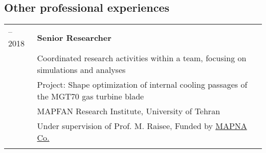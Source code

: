 
\subsection{Other professional experiences}{}
\begin{longtable}[l]{>{\raggedleft\arraybackslash}p{}|p{}}

   

    2015 -- 2018 & \textbf{Senior Researcher}\\
    & Coordinated research activities within a team, focusing on simulations and analyses \\
    & Project: Shape optimization of internal cooling passages of the MGT70 gas turbine blade\\
    & MAPFAN Research Institute, University of Tehran \\
    & Under supervision of Prof. M. Raisee, Funded by \href{http://www.mapnagroup.com/en/}{MAPNA Co.} \\		
    \multicolumn{2}{c}{} \\

    


\end{longtable}
